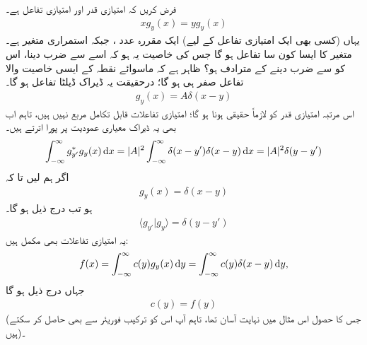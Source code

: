 \quad
فرض کریں کہ  امتیازی قدر اور  امتیازی تفاعل ہے۔
\begin{align}
xg_{y}(x) = yg_{y}(x) 
\end{align}
یہاں (کسی بھی ایک امتیازی تفاعل کے لیے)   ایک مقررہ عدد ،  جبکہ  استمراری متغیر ہے۔متغیر   کا  ایسا کون سا   تفاعل ہو گا جس کی  خاصیت یہ ہو  کہ اسے   سے ضرب دینا،  اس کو   سے ضرب دینے کے مترادف  ہو؟ ظاہر ہے کہ   ماسوائے نقطہ   کے    ایسی خاصیت والا تفاعل  صفر ہی ہو گا؛  درحقیقت یہ ڈیراک ڈیلٹا تفاعل ہو گا۔
\begin{align*}
g_{y}(x) = A\delta(x-y)
\end{align*}
اس  مرتبہ امتیازی   قدر کو    لازماً حقیقی   ہونا ہو  گا؛  امتیازی تفاعلات قابل تکامل مربع نہیں ہیں، تاہم  اب بھی یہ ڈیراک معیاری  عمودیت  پر پورا اترتے ہیں۔
\begin{align}
\int_{-\infty}^{\infty}g_{y'}^{*}g_{y}(x) \dif x = |A|^{2}\int_{-\infty}^{\infty}\delta(x-y')\delta(x-y) \dif x = |A|^{2} \delta (y-y')
\end{align}
اگر ہم  لیں تا کہ
\begin{align}
g_{y}(x) = \delta (x-y)
\end{align}
ہو تب درج ذیل ہو گا۔
\begin{align}
\langle g_{y'} | g_{y} \rangle = \delta (y-y')
\end{align}
یہ  امتیازی  تفاعلات بھی مکمل ہیں:
\begin{align}
f(x) = \int_{-\infty}^{\infty} c(y)g_{y}(x) \dif y = \int_{-\infty}^{\infty} c(y)\delta(x-y)\dif y,
\end{align}
جہاں درج ذیل ہو گا
\begin{align}
c(y) = f(y)
\end{align}
(جس کا حصول اس مثال میں  نہایت آسان   تھا، تاہم  آپ اس کو ترکیب  فوریئر  سے بھی حاصل کر سکتے ہیں)۔

